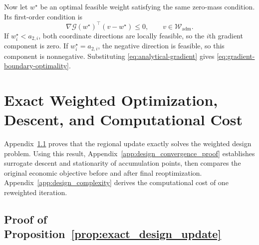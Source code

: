 \documentclass[a4paper,fleqn]{cas-sc}
\theoremstyle{remark}
\theoremstyle{plain}
\begin{document}
Now let $w^\star$ be an optimal feasible weight satisfying the same zero-mass condition. Its first-order condition is
\[
    \nabla\mathcal G(w^\star)^\top(v-w^\star)\le0,\qquad v\in\mathcal W_{\mathrm{adm}}.
\]
If $w_i^\star<a_{2,i}$, both coordinate directions are locally feasible, so the $i$th gradient component is zero. If $w_i^\star=a_{2,i}$, the negative direction is feasible, so this component is nonnegative. Substituting \eqref{eq:analytical-gradient} gives \eqref{eq:gradient-boundary-optimality}.


\section{Exact Weighted Optimization, Descent, and Computational Cost}\label{app:design_proofs}

Appendix~\ref{app:design_exact_proof} proves that the regional update exactly solves the weighted design problem. Using this result, Appendix~\ref{app:design_convergence_proof} establishes surrogate descent and stationarity of accumulation points, then compares the original economic objective before and after final reoptimization. Appendix~\ref{app:design_complexity} derives the computational cost of one reweighted iteration.

\subsection{Proof of Proposition~\ref{prop:exact_design_update}}\label{app:design_exact_proof}
\end{document}
